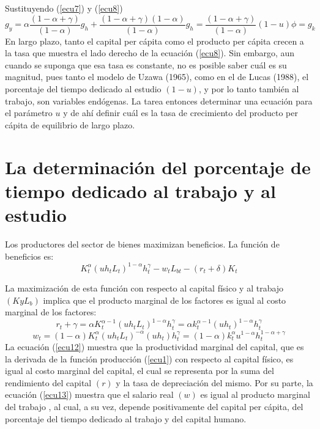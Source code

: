 \documentclass[12pt,notitlepage]{report}
\begin{document}
	Sustituyendo (\ref{ecu7}) y (\ref{ecu8})
	\begin{equation}\label{ecu10}
		g_y=\alpha\frac{(1-\alpha +\gamma)}{(1-\alpha)}g_h + \frac{(1-\alpha + \gamma)(1-\alpha)}{(1-\alpha)}g_h=\frac{(1-\alpha + \gamma)}{(1-\alpha)}(1-u)\phi=g_k
	\end{equation}
	En largo plazo, tanto el capital per cápita como el producto per cápita crecen a la tasa que muestra el lado derecho de la ecuación (\ref{ecu8}). Sin embargo, aun cuando se suponga que esa tasa es constante, no es posible saber cuál es su magnitud, pues tanto el modelo de Uzawa (1965), como en el de Lucas (1988), el porcentaje del tiempo dedicado al estudio $(1-u)$, y por lo tanto también al trabajo, son variables endógenas. La tarea entonces determinar una ecuación para el parámetro $u$ y de ahí definir cuál es la tasa de crecimiento del producto per cápita de equilibrio de largo plazo.
	
	\chapter{La determinación del porcentaje de tiempo dedicado al trabajo y al estudio}
	\setcounter{equation}{10}
	Los productores del sector de bienes maximizan beneficios. La función de beneficios es:
	\begin{equation}\label{ecu11}
		K_t^\alpha (uh_tL_t)^{1-\alpha}h_t^\gamma -w_tL_{bt}-(r_t + \delta)K_t
	\end{equation}
	
	La maximización de esta función con respecto al capital físico y al trabajo $(KyL_b)$ implica que el producto marginal de los factores es igual al costo marginal de los factores:
	\begin{equation}\label{ecu12}
		r_t + \gamma=\alpha K_t^{\alpha -1}(uh_tL_t)^{1-\alpha}h_t^\gamma=\alpha k_t^{\alpha -1}(uh_t)^{1-\alpha}h_t^\gamma
	\end{equation}
	\begin{equation}\label{ecu13}
		w_t=(1-\alpha)K_t^\alpha(uh_tL_t)^{-\alpha}(uh_t)h_t^\gamma=(1-\alpha)k_t^\alpha u^{1-\alpha}h_t^{1-\alpha+\gamma}
	\end{equation}
	La ecuación (\ref{ecu12}) muestra que la productividad marginal del capital, que es la derivada de la función producción (\ref{ecu1}) con respecto al capital físico, es igual al costo marginal del capital, el cual se representa por la suma del rendimiento del capital $(r)$ y la tasa de depreciación del mismo. Por su parte, la ecuación (\ref{ecu13}) muestra que el salario real $(w)$ es igual al producto marginal del trabajo , al cual, a su vez, depende positivamente del capital per cápita, del porcentaje del tiempo dedicado al trabajo y del capital humano.
	
\end{document}
